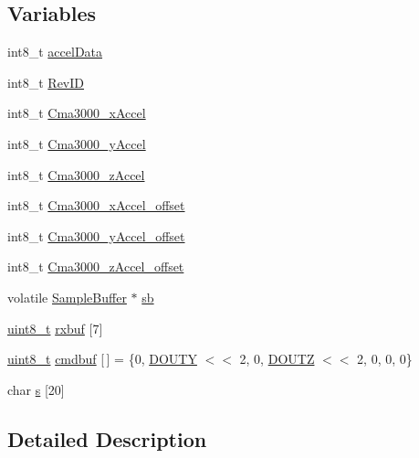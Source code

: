 \subsection*{Variables}
\begin{DoxyCompactItemize}
\item 
int8\-\_\-t \hyperlink{group__HAL__Cma3000_ga2463200b1bea9027c65cd6a7988b92cc}{accel\-Data}
\item 
int8\-\_\-t \hyperlink{group__HAL__Cma3000_gab84df94ff0cd4d502b2faae204b4d24f}{Rev\-I\-D}
\item 
int8\-\_\-t \hyperlink{group__HAL__Cma3000_gac2f4ad3ece4f2cb31fedfa8628ac1688}{Cma3000\-\_\-x\-Accel}
\item 
int8\-\_\-t \hyperlink{group__HAL__Cma3000_ga847617eef332231c449861a1475e8345}{Cma3000\-\_\-y\-Accel}
\item 
int8\-\_\-t \hyperlink{group__HAL__Cma3000_ga862a9e332db3dc346369fb5fc4ef2e07}{Cma3000\-\_\-z\-Accel}
\item 
int8\-\_\-t \hyperlink{group__HAL__Cma3000_ga335dff88b3e8e05ee7d26177f734faf8}{Cma3000\-\_\-x\-Accel\-\_\-offset}
\item 
int8\-\_\-t \hyperlink{group__HAL__Cma3000_ga71431a853962e1aab0d44b3901d9ce53}{Cma3000\-\_\-y\-Accel\-\_\-offset}
\item 
int8\-\_\-t \hyperlink{group__HAL__Cma3000_gaeed4d3e43f6b93fad6b1a8176f3b4ef5}{Cma3000\-\_\-z\-Accel\-\_\-offset}
\item 
volatile \hyperlink{structSampleBuffer}{Sample\-Buffer} $\ast$ \hyperlink{group__HAL__Cma3000_ga13d2ec11123575d9acaa32e40eb4fa8b}{sb}
\item 
\hyperlink{typedefs_8h_aba7bc1797add20fe3efdf37ced1182c5}{uint8\-\_\-t} \hyperlink{group__HAL__Cma3000_gaacf8a00ccb887c06968f98f27def8716}{rxbuf} \mbox{[}7\mbox{]}
\item 
\hyperlink{typedefs_8h_aba7bc1797add20fe3efdf37ced1182c5}{uint8\-\_\-t} \hyperlink{group__HAL__Cma3000_gab3dbd75bdfcd17ed7daed83b67e55d25}{cmdbuf} \mbox{[}$\,$\mbox{]} = \{0, \hyperlink{accel_8h_a2d5b60fb9f1b096949528febf596b114}{D\-O\-U\-T\-Y} $<$$<$ 2, 0, \hyperlink{accel_8h_a41ef57dfc28efea7d50b295d020a5149}{D\-O\-U\-T\-Z} $<$$<$ 2, 0, 0, 0\}
\item 
char \hyperlink{group__HAL__Cma3000_ga729a0a31c6732422f598675267b8cb2d}{s} \mbox{[}20\mbox{]}
\end{DoxyCompactItemize}


\subsection{Detailed Description}


